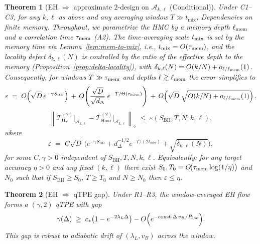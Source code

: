 \documentclass[11pt,a4paper]{article}
\newcommand{\HMC}{\textsc{HMC}\xspace}
\theoremstyle{plain}
\newtheorem{theorem}{Theorem}
\theoremstyle{definition}
\theoremstyle{remark}
\begin{document}
\begin{theorem}[EH $\Rightarrow$ approximate $2$-design on $\mathscr{A}_{k,\ell}$ (Conditional)]
%
\label{thm:EH-2design}
\label{thm:eh2design}%
Under C1--C3, for any $k,\ell$ as above and any averaging window $T\gg t_{\mathrm{mix}}$,
\noindent\emph{Dependencies on finite memory.} Throughout, we parametrize the \HMC{} by a memory depth $\ell_{\rm mem}$ and a correlation time $\tau_{\rm mem}$ (A2).
The time-averaging scale $t_{\rm mix}$ is set by the memory time via Lemma~\ref{lem:mem-to-mix}, i.e., $t_{\rm mix}=O(\tau_{\rm mem})$,
and the locality defect $\delta_{k,\ell}(N)$ is controlled by the ratio of the effective depth to the memory (Proposition~\ref{prop:delta-locality}),
with $\delta_{k,\ell}(N)=O(k/N)+o_{\ell/\ell_{\rm mem}}(1)$.
Consequently, for windows $T\gg \tau_{\rm mem}$ and depths $\ell\gtrsim \ell_{\rm mem}$ the error simplifies to
\begin{equation}
 \varepsilon \;=\; O\!\left( \sqrt{D}\,e^{-\gamma S_{\mathrm{BH}}} \right)
 \, +\, O\!\left( \frac{\sqrt{D}}{\sqrt{d_\Delta}}\; e^{-T/\Theta(\tau_{\rm mem})} \right)
 \, +\, O\!\left( \sqrt{D}\;\sqrt{O(k/N)+o_{\ell/\ell_{\rm mem}}(1)} \right).
\end{equation}
\begin{equation}\label{eq:main-eps}
 \left\| \mathcal{T}^{(2)}_{\mathsf{U}_T}\big|_{\mathscr{A}_{k,\ell}} - \mathcal{T}^{(2)}_{\mathrm{Haar}}\big|_{\mathscr{A}_{k,\ell}} \right\|_{\diamond}
 \;\le\; \varepsilon(S_{\mathrm{BH}},T,N;k,\ell),
\end{equation}
where
\begin{equation}
 \varepsilon \;=\; C \sqrt{D}\,\Big( e^{-\gamma S_{\mathrm{BH}}}
 + d_\Delta^{-1/2} e^{-T/(2t_{\mathrm{mix}})} + \sqrt{\delta_{k,\ell}(N)} \Big),
\end{equation}
for some $C,\gamma>0$ independent of $S_{\mathrm{BH}},T,N,k,\ell$.
Equivalently: for any target accuracy $\eta>0$ and any fixed $(k,\ell)$ there exist $S_0,T_0=O\!\big(\tau_{\rm mem}\log(1/\eta)\big)$ and $N_0$ such that if $S_{\mathrm{BH}}\ge S_0$, $T\ge T_0$ and $N\ge N_0$ then $\varepsilon\le \eta$.
\end{theorem}

\begin{theorem}[EH $\Rightarrow$ qTPE gap]\label{thm:eh-qtpe-gap}
Under R1--R3, the window-averaged EH flow forms a $(\gamma,2)$ qTPE with gap
\[
\gamma(\Delta) \;\ge\; c_*\!\left(1-e^{-2\lambda_L \Delta}\right) - O\!\left(e^{-\mathrm{const}\cdot \Delta\, v_B/R_{\rm loc}}\right)\!.
\]
This gap is robust to adiabatic drift of $(\lambda_L, v_B)$ across the window.
\end{theorem}
\end{document}

